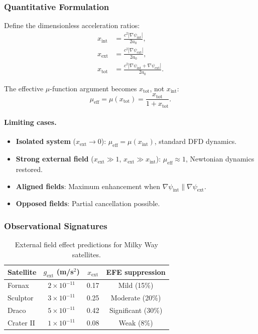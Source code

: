 \subsubsection{Quantitative Formulation}

Define the dimensionless acceleration ratios:
\begin{align}
x_{\mathrm{int}} &= \frac{c^2|\nabla\psi_{\mathrm{int}}|}{2a_0}, \\
x_{\mathrm{ext}} &= \frac{c^2|\nabla\psi_{\mathrm{ext}}|}{2a_0}, \\
x_{\mathrm{tot}} &= \frac{c^2|\nabla\psi_{\mathrm{int}} + \nabla\psi_{\mathrm{ext}}|}{2a_0}.
\end{align}

The effective $\mu$-function argument becomes $x_{\mathrm{tot}}$, not $x_{\mathrm{int}}$:
\begin{equation}
\mu_{\mathrm{eff}} = \mu(x_{\mathrm{tot}}) = \frac{x_{\mathrm{tot}}}{1 + x_{\mathrm{tot}}}.
\end{equation}

\paragraph{Limiting cases.}
\begin{itemize}
\item \textbf{Isolated system} ($x_{\mathrm{ext}} \to 0$): $\mu_{\mathrm{eff}} = \mu(x_{\mathrm{int}})$, 
standard DFD dynamics.
\item \textbf{Strong external field} ($x_{\mathrm{ext}} \gg 1$, $x_{\mathrm{ext}} \gg x_{\mathrm{int}}$): 
$\mu_{\mathrm{eff}} \approx 1$, Newtonian dynamics restored.
\item \textbf{Aligned fields}: Maximum enhancement when $\nabla\psi_{\mathrm{int}} \parallel \nabla\psi_{\mathrm{ext}}$.
\item \textbf{Opposed fields}: Partial cancellation possible.
\end{itemize}

\subsubsection{Observational Signatures}

\begin{table}[h]
\centering
\caption{External field effect predictions for Milky Way satellites.}\label{tab:efe-predictions}
\begin{tabular}{lccc}
\toprule
Satellite & $g_{\mathrm{ext}}$ (m/s$^2$) & $x_{\mathrm{ext}}$ & EFE suppression \\
\midrule
Fornax & $2 \times 10^{-11}$ & 0.17 & Mild (15\%) \\
Sculptor & $3 \times 10^{-11}$ & 0.25 & Moderate (20\%) \\
Draco & $5 \times 10^{-11}$ & 0.42 & Significant (30\%) \\
Crater II & $1 \times 10^{-11}$ & 0.08 & Weak (8\%) \\
\bottomrule
\end{tabular}
\end{table}

